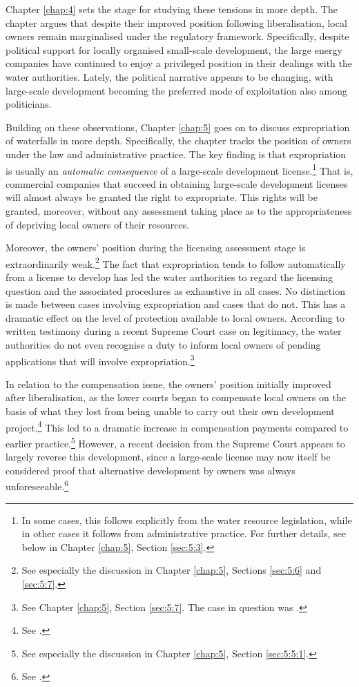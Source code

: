 Chapter \ref{chap:4} sets the stage for studying these tensions in more depth. The chapter argues that despite their improved position following liberalisation, local owners remain marginalised under the regulatory framework. Specifically, despite political support for locally organised small-scale development, the large energy companies have continued to enjoy a privileged position in their dealings with the water authorities. Lately, the political narrative appears to be changing, with large-scale development becoming the preferred mode of exploitation also among politicians.

Building on these observations, Chapter \ref{chap:5} goes on to discuss expropriation of waterfalls in more depth. Specifically, the chapter tracks the position of owners under the law and administrative practice. The key finding is that expropriation is usually an {\it automatic consequence} of a large-scale development license.\footnote{In some cases, this follows explicitly from the water resource legislation, while in other cases it follows from administrative practice. For further details, see below in Chapter \ref{chap:5}, Section \ref{sec:5:3}.} That is, commercial companies that succeed in obtaining large-scale development licenses will almost always be granted the right to expropriate. This rights will be granted, moreover, without any assessment taking place as to the appropriateness of depriving local owners of their resources.

Moreover, the owners' position during the licensing assessment stage is extraordinarily weak.\footnote{See especially the discussion in Chapter \ref{chap:5}, Sections \ref{sec:5:6} and \ref{sec:5:7}.} The fact that expropriation tends to follow automatically from a license to develop has led the water authorities to regard the licensing question and the associated procedures as exhaustive in all cases. No distinction is made between cases involving expropriation and cases that do not. This has a dramatic effect on the level of protection available to local owners. According to written testimony during a recent Supreme Court case on legitimacy, the water authorities do not even recognise a duty to inform local owners of pending applications that will involve expropriation.\footnote{See Chapter \ref{chap:5}, Section \ref{sec:5:7}. The case in question was \cite{jorpeland11}.}

In relation to the compensation issue, the owners' position initially improved after liberalisation, as the lower courts began to compensate local owners on the basis of what they lost from being unable to carry out their own development project.\footnote{See \cite{uleberg08}.} This led to a dramatic increase in compensation payments compared to earlier practice.\footnote{See especially the discussion in Chapter \ref{chap:5}, Section \ref{sec:5:5:1}.} However, a recent decision from the Supreme Court appears to largely reverse this development, since a large-scale license may now itself be considered proof that alternative development by owners was always unforeseeable.\footnote{See \cite{otra13}.}

